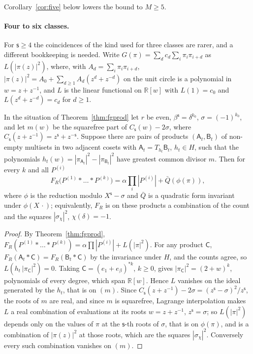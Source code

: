 Corollary~\ref{cor:five} below lowers the bound to $M\ge5$.

\paragraph{Four to six classes.} For $\mathsf{s}\ge4$ the coincidences of the kind used for three classes are rarer, and a different bookkeeping is needed. Write $G(\pi)=\sum_dc_d\sum_i\pi_i\pi_{i+d}$ as $L(|\pi(z)|^{2})$, where, with $A_d=\sum_i\pi_i\pi_{i+d}$, $|\pi(z)|^{2}=A_0+\sum_{d\ge1}A_d(z^{d}+z^{-d})$ on the unit circle is a polynomial in $w=z+z^{-1}$, and $L$ is the linear functional on $\mathbb{R}[w]$ with $L(1)=c_0$ and $L(z^{d}+z^{-d})=c_d$ for $d\ge1$.

\begin{proposition}\label{prop:schema}
In the situation of Theorem~\ref{thm:fgprod} let $r$ be even, $\beta^{\mathsf{s}}=\delta^{k_0}$, $\sigma=(-1)^{k_0}$, and let $m(w)$ be the squarefree part of $C_{\mathsf{s}}(w)-2\sigma$, where $C_{\mathsf{s}}(z+z^{-1})=z^{\mathsf{s}}+z^{-\mathsf{s}}$. Suppose there are pairs of products $(\mathsf{A}_t,\mathsf{B}_t)$ of non-empty multisets in two adjacent cosets with $\mathsf{A}_t=T_{h_t}\mathsf{B}_t$, $h_t\in H$, such that the polynomials $h_t(w)=|\pi_{\mathsf{A}_t}|^{2}-|\pi_{\mathsf{B}_t}|^{2}$ have greatest common divisor $m$. Then for every $k$ and all $P^{(i)}$
\[
F_R\bigl(P^{(1)}*\dots*P^{(k)}\bigr)=\alpha\prod_i|P^{(i)}|+\bar Q(\phi(\pi)),
\]
where $\phi$ is the reduction modulo $X^{\mathsf{s}}-\sigma$ and $\bar Q$ is a quadratic form invariant under $\phi(X\,\cdot)$; equivalently, $F_R$ is on these products a combination of the count and the squares $|\sigma_\chi|^{2}$, $\chi(\delta)=-1$.
\end{proposition}
\begin{proof}
By Theorem~\ref{thm:fgprod}, $F_R(P^{(1)}*\dots*P^{(k)})=\alpha\prod|P^{(i)}|+L(|\pi|^{2})$. For any product $\mathsf{C}$, $F_R(\mathsf{A}_t*\mathsf{C})=F_R(\mathsf{B}_t*\mathsf{C})$ by the invariance under $H$, and the counts agree, so $L(h_t\,|\pi_{\mathsf{C}}|^{2})=0$. Taking $\mathsf{C}=(e_1+e_\beta)^{*k}$, $k\ge0$, gives $|\pi_{\mathsf{C}}|^{2}=(2+w)^{k}$, polynomials of every degree, which span $\mathbb{R}[w]$. Hence $L$ vanishes on the ideal generated by the $h_t$, that is on $(m)$. Since $C_{\mathsf{s}}(z+z^{-1})-2\sigma=(z^{\mathsf{s}}-\sigma)^{2}/z^{\mathsf{s}}$, the roots of $m$ are real, and since $m$ is squarefree, Lagrange interpolation makes $L$ a real combination of evaluations at its roots $w=z+z^{-1}$, $z^{\mathsf{s}}=\sigma$; so $L(|\pi|^{2})$ depends only on the values of $\pi$ at the $\mathsf{s}$-th roots of $\sigma$, that is on $\phi(\pi)$, and is a combination of $|\pi(z)|^{2}$ at those roots, which are the squares $|\sigma_\chi|^{2}$. Conversely every such combination vanishes on $(m)$.
\end{proof}


